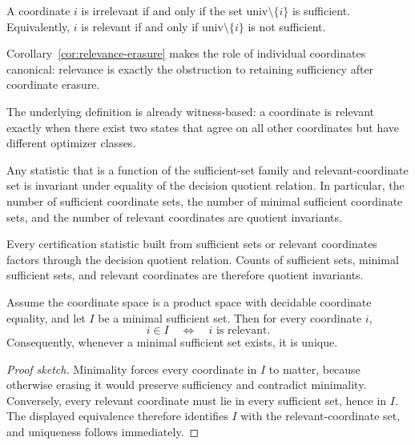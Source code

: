 \begin{corollary}\label{cor:relevance-erasure}
A coordinate $i$ is irrelevant if and only if the set $\mathrm{univ}\setminus\{i\}$ is sufficient. Equivalently, $i$ is relevant if and only if $\mathrm{univ}\setminus\{i\}$ is not sufficient.
\end{corollary}

Corollary~\ref{cor:relevance-erasure} makes the role of individual coordinates canonical: relevance is exactly the obstruction to retaining sufficiency after coordinate erasure.

The underlying definition is already witness-based: a coordinate is relevant exactly when there exist two states that agree on all other coordinates but have different optimizer classes.

\begin{corollary}\label{cor:statistics-factor}
Any statistic that is a function of the sufficient-set family and relevant-coordinate set is invariant under equality of the decision quotient relation. In particular, the number of sufficient coordinate sets, the number of minimal sufficient coordinate sets, and the number of relevant coordinates are quotient invariants.
\end{corollary}

Every certification statistic built from sufficient sets or relevant coordinates factors through the decision quotient relation. Counts of sufficient sets, minimal sufficient sets, and relevant coordinates are therefore quotient invariants.

\begin{proposition}\label{prop:minimal-sufficient-canonical}
Assume the coordinate space is a product space with decidable coordinate equality, and let $I$ be a minimal sufficient set. Then for every coordinate $i$,
\[
i \in I \quad\Longleftrightarrow\quad i \text{ is relevant}.
\]
Consequently, whenever a minimal sufficient set exists, it is unique.
\end{proposition}

\begin{proof}[Proof sketch]
Minimality forces every coordinate in $I$ to matter, because otherwise erasing it would preserve sufficiency and contradict minimality. Conversely, every relevant coordinate must lie in every sufficient set, hence in $I$. The displayed equivalence therefore identifies $I$ with the relevant-coordinate set, and uniqueness follows immediately.
\end{proof}

